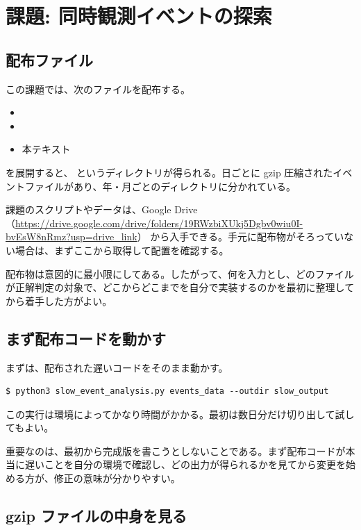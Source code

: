 \chapter{課題: 同時観測イベントの探索}

\section{配布ファイル}

この課題では、次のファイルを配布する。

\begin{itemize}
\item {}
\item {}
\item 本テキスト
\end{itemize}

 を展開すると、 というディレクトリが得られる。日ごとに gzip 圧縮されたイベントファイルがあり、年・月ごとのディレクトリに分かれている。

課題のスクリプトやデータは、Google Drive
（\url{https://drive.google.com/drive/folders/19RWzbiXUkj5Dgbv0wiu0I-bvEsW8nRmz?usp=drive_link}）
から入手できる。手元に配布物がそろっていない場合は、まずここから取得して配置を確認する。

配布物は意図的に最小限にしてある。したがって、何を入力とし、どのファイルが正解判定の対象で、どこからどこまでを自分で実装するのかを最初に整理してから着手した方がよい。

\section{まず配布コードを動かす}

まずは、配布された遅いコードをそのまま動かす。

\begin{lstlisting}[numbers=none, xleftmargin=2\zw, caption={配布コードの実行}]
$ python3 slow_event_analysis.py events_data --outdir slow_output
\end{lstlisting}

この実行は環境によってかなり時間がかかる。最初は数日分だけ切り出して試してもよい。

重要なのは、最初から完成版を書こうとしないことである。まず配布コードが本当に遅いことを自分の環境で確認し、どの出力が得られるかを見てから変更を始める方が、修正の意味が分かりやすい。

\section{gzip ファイルの中身を見る}

